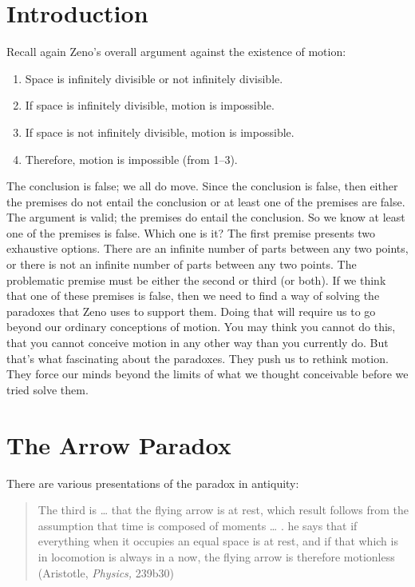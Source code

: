 \documentclass[oneside]{article}
\begin{document}
\thispagestyle{fancy}



\section{Introduction}

Recall again Zeno's overall argument against the existence of motion:

\begin{enumerate}
\item Space is infinitely divisible or not infinitely divisible.
\item  If space is infinitely divisible, motion is impossible.
\item  If space is not infinitely divisible, motion is impossible.
\item  Therefore, motion is impossible (from 1--3).
\end{enumerate}
The conclusion is false; we all do move. Since the conclusion is false, then either the premises do not entail the conclusion or at least one of the premises are false. The argument is valid; the premises do entail the conclusion. So we know at least one of the premises is false. Which one is it? The first premise presents two exhaustive options. There are an infinite number of parts between any two points, or there is not an infinite number of parts between any two points. The problematic premise must be either the second or third (or both). If we think that one of these premises is false, then we need to find a way of solving the paradoxes that Zeno uses to support them. Doing that will require us to go beyond our ordinary conceptions of motion. You may think you cannot do this, that you cannot conceive motion in any other way than you currently do. But that's what fascinating about the paradoxes. They push us to rethink motion. They force our minds beyond the limits of what we thought conceivable before we tried solve them. 

\section{The Arrow Paradox}\label{the-arrow-paradox}

There are various presentations of the paradox in antiquity: 
\begin{quote}
The third is \ldots{} that the flying arrow is at rest, which result
follows from the assumption that time is composed of moments \ldots{} .
he says that if everything when it occupies an equal space is at rest,
and if that which is in locomotion is always in a now, the flying arrow
is therefore motionless (Aristotle, \emph{Physics,} 239b30)
\end{quote}
\end{document}

